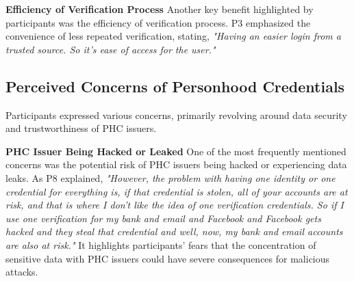 \textbf{Efficiency of Verification Process} Another key benefit highlighted by participants was the efficiency of verification process. P3 emphasized the convenience of less repeated verification, stating, \textit{"Having an easier login from a trusted source. So it's ease of access for the user." }


\subsection{Perceived Concerns of Personhood Credentials}
Participants expressed various concerns, primarily revolving around data security and trustworthiness of PHC issuers. 

\textbf{PHC Issuer Being Hacked or Leaked} One of the most frequently mentioned concerns was the potential risk of PHC issuers being hacked or experiencing data leaks. As P8 explained, \textit{"However, the problem with having one identity or one credential for everything is, if that credential is stolen, all of your accounts are at risk, and that is where I don't like the idea of one verification credentials. So if I use one verification for my bank and email and Facebook and Facebook gets hacked and they steal that credential and well, now, my bank and email accounts are also at risk."} It highlights participants' fears that the concentration of sensitive data with PHC issuers could have severe consequences for malicious attacks.



